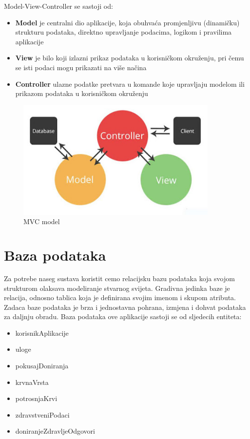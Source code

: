 	 {Model-View-Controller se sastoji od:}
	\begin{itemize}
		\item 	\textbf{Model} {je centralni dio aplikacije, koja obuhvaća promjenljivu (dinamičku) strukturu podataka, direktno upravljanje podacima, logikom i pravilima aplikacije}
		\item 	\textbf{View}{ je bilo koji izlazni prikaz podataka u korisničkom okruženju, pri čemu se isti podaci mogu prikazati na više načina}
		\item 	\textbf{Controller} {ulazne podatke pretvara u komande koje upravljaju modelom ili prikazom podataka u korisničkom okruženju}
	\end{itemize}
	
		\begin{figure}[H]
			\centering
			\includegraphics[width=100mm, scale=0.1]{slike/MVC.jpeg}
			\caption{MVC model}
			\label{fig:arhitektura}
		\end{figure}
\eject

		

				
		\section{Baza podataka}
			
			
			
		Za potrebe naseg sustava koristit cemo relacijsku bazu podataka koja svojom strukturom olaksava modeliranje stvarnog svijeta. Gradivna jedinka baze je relacija, odnosno tablica koja je definirana svojim imenom i skupom atributa. Zadaca baze podataka je brza i jednostavna pohrana, izmjena i dohvat podataka za daljnju obradu.
Baza podataka ove aplikacije sastoji se od sljedecih entiteta: 
\begin{itemize}
		\item korisnikAplikacije
		\item uloge
		\item pokusajDoniranja
		\item krvnaVrsta
		\item potrosnjaKrvi
		\item zdravstveniPodaci
		\item doniranjeZdravljeOdgovori
		
	\end{itemize}

